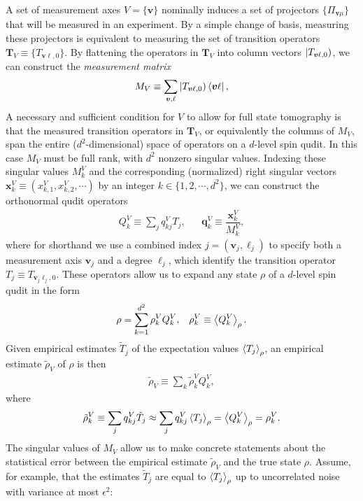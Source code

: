 \documentclass[notitlepage,twocolumn]{revtex4-2}
\newcommand{\f}[2]{\dfrac{#1}{#2}} %
\newcommand{\p}[1]{\left(#1\right)} %
\newcommand{\bk}{\Braket} %
\renewcommand{\v}{\bm} %
\renewcommand{\set}[1]{\{#1\}} %
\def\oket#1{\mathinner{|{#1})}}
\begin{document}
A set of measurement axes $V=\set{\v v}$ nominally induces a set of projectors $\set{\Pi_{\v v\mu}}$ that will be measured in an experiment.
By a simple change of basis, measuring these projectors is equivalent to measuring the set of transition operators $\v T_V\equiv\set{T_{\v v\ell,0}}$.
By flattening the operators in $\v T_V$ into column vectors $\oket{T_{\v v\ell,0}}$, we can construct the {\it measurement matrix}
\begin{align}
  M_V \equiv \sum_{\v v,\ell} \oket{T_{\v v\ell,0}} \bra{\v v\ell},
  \label{eq:meas_mat}
\end{align}
A necessary and sufficient condition for $V$ to allow for full state tomography is that the measured transition operators in $\v T_V$, or equivalently the columns of $M_V$, span the entire ($d^2$-dimensional) space of operators on a $d$-level spin qudit.
In this case $M_V$ must be full rank, with $d^2$ nonzero singular values.
Indexing these singular values $M^V_k$ and the corresponding (normalized) right singular vectors $\v x^V_k\equiv(x^V_{k,1},x^V_{k,2},\cdots)$ by an integer $k\in\set{1,2,\cdots,d^2}$, we can construct the orthonormal qudit operators
\begin{align}
  Q^V_k \equiv \sum_j q^V_{kj} T_j,
  &&
  \v q^V_k \equiv \f{\v x^V_k}{M^V_k},
\end{align}
where for shorthand we use a combined index $j=\p{\v v_j,\ell_j}$ to specify both a measurement axis $\v v_j$ and a degree $\ell_j$, which identify the transition operator $T_j\equiv T_{\v v_j\ell_j,0}$.
These operators allow us to expand any state $\rho$ of a $d$-level spin qudit in the form
\begin{align}
  \rho = \sum_{k=1}^{d^2} \rho_k^V Q_k^V,
  &&
  \rho_k^V \equiv \bk{Q^V_k}_\rho.
\end{align}
Given empirical estimates $\tilde T_j$ of the expectation values $\bk{T_j}_\rho$, an empirical estimate $\tilde\rho_V$ of $\rho$ is then
\begin{align}
  \tilde\rho_V \equiv \sum_k \tilde\rho^V_k Q^V_k,
  \label{eq:reconstructed_state}
\end{align}
where
\begin{align}
  \tilde\rho^V_k \equiv \sum_j q^V_{kj} \tilde T_j
  \approx \sum_j q^V_{kj} \bk{T_j}_\rho
  = \bk{Q^V_k}_\rho
  = \rho^V_k.
\end{align}
The singular values of $M_V$ allow us to make concrete statements about the statistical error between the empirical estimate $\tilde\rho_V$ and the true state $\rho$.
Assume, for example, that the estimates $\tilde T_j$ are equal to $\bk{T_j}_\rho$ up to uncorrelated noise with variance at most $\epsilon^2$:
\end{document}
